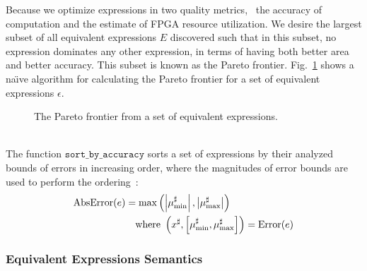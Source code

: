 Because we optimize expressions in two quality metrics, \ie~the accuracy of
computation and the estimate of FPGA resource utilization. We desire the
largest subset of all equivalent expressions $E$ discovered such that in this
subset, no expression dominates any other expression, in terms of having both
better area and better accuracy. This subset is known as the Pareto frontier.
Fig.~\ref{alg:pareto} shows a na{\"\i}ve algorithm for calculating the Pareto
frontier for a set of equivalent expressions $\epsilon$.
\begin{figure}[ht]
    \centering
    \begin{algorithmic}
                \EndIf%
            \EndFor%
        \EndFunction%
    \end{algorithmic}
    \caption{The Pareto frontier from a set of equivalent expressions.
    }\label{alg:pareto}
\end{figure} \\
The function $\mathtt{sort\_by\_accuracy}$ sorts a set of expressions by their
analyzed bounds of errors in increasing order, where the magnitudes of error
bounds are used to perform the ordering~\cite{martel07}:
\begin{equation}
    \begin{aligned}
        \operatorname{\mathrm{AbsError}}(e) &= \max\left(
            \left| \mu^\sharp_{\min} \right|,
            \left| \mu^\sharp_{\max} \right|
        \right) \\
        & \quad \text{where~}
        \left(
            x^\sharp, \left[ \mu^\sharp_{\min}, \mu^\sharp_{\max} \right]
        \right) = \operatorname{\mathrm{Error}}(e)
    \end{aligned}
\end{equation}

\subsubsection{Equivalent Expressions Semantics}

